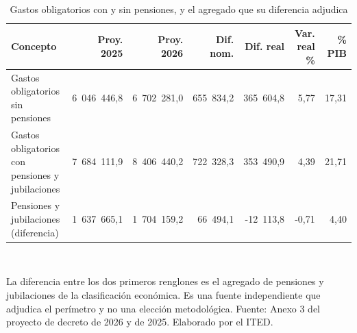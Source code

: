 \begin{table}[htbp]
\centering
\scriptsize
\caption{Gastos obligatorios con y sin pensiones, y el agregado que su diferencia adjudica}
\label{cua:C4_4}
\begin{tabular}{p{5.2cm}rrrrrr}
\toprule
\textbf{Concepto} & \textbf{Proy. 2025} & \textbf{Proy. 2026} & \textbf{Dif. nom.} & \textbf{Dif. real} & \textbf{Var. real \%} & \textbf{\% PIB} \\
\midrule
Gastos obligatorios sin pensiones & 6 046 446,8 & 6 702 281,0 & 655 834,2 & 365 604,8 & 5,77 & 17,31 \\
Gastos obligatorios con pensiones y jubilaciones & 7 684 111,9 & 8 406 440,2 & 722 328,3 & 353 490,9 & 4,39 & 21,71 \\
Pensiones y jubilaciones (diferencia) & 1 637 665,1 & 1 704 159,2 & 66 494,1 & -12 113,8 & -0,71 & 4,40 \\
\bottomrule
\end{tabular}
\\[2pt]\begin{minipage}{0.92\textwidth}\scriptsize La diferencia entre los dos primeros renglones es el agregado de pensiones y jubilaciones de la clasificación económica. Es una fuente independiente que adjudica el perímetro y no una elección metodológica. Fuente: Anexo 3 del proyecto de decreto de 2026 y de 2025. Elaborado por el ITED.\end{minipage}
\end{table}

